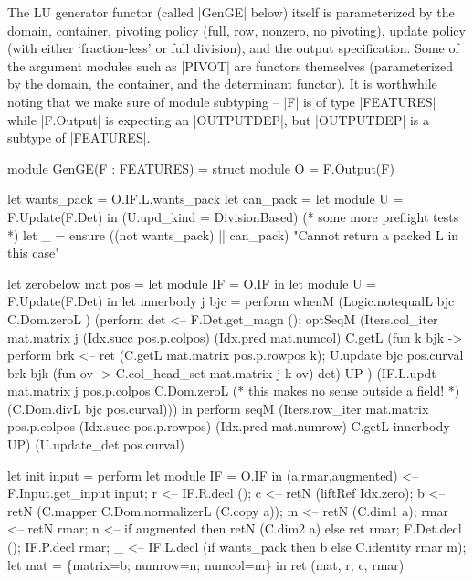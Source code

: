 \documentclass{elsart}
\begin{document}
The LU generator functor (called |GenGE| below) itself is 
parameterized by the domain, container, pivoting policy (full, row,
nonzero, no pivoting), update policy (with either `fraction-less'
or full division), and the output specification. Some of the
argument modules such as |PIVOT| are functors themselves (parameterized
by the domain, the container, and the determinant functor). It is 
worthwhile noting that we make sure of module subtyping -- |F| is of
type |FEATURES| while |F.Output| is expecting an |OUTPUTDEP|, but
|OUTPUTDEP| is a subtype of |FEATURES|.

\begin{code2}
module GenGE(F : FEATURES) = struct
  module O = F.Output(F)

  let wants_pack = O.IF.L.wants_pack
  let can_pack   = 
    let module U = F.Update(F.Det) in
    (U.upd_kind = DivisionBased)
  (* some more preflight tests *)
  let _ = ensure ((not wants_pack) || can_pack) 
         "Cannot return a packed L in this case"

  let zerobelow mat pos = 
    let module IF = O.IF in
    let module U = F.Update(F.Det) in
    let innerbody j bjc = perform
      whenM (Logic.notequalL bjc C.Dom.zeroL ) (perform
        det <-- F.Det.get_magn ();
        optSeqM (Iters.col_iter mat.matrix j (Idx.succ pos.p.colpos) 
         (Idx.pred mat.numcol) C.getL
              (fun k bjk -> perform
              brk <-- ret (C.getL mat.matrix pos.p.rowpos k);
              U.update bjc pos.curval brk bjk 
                (fun ov -> C.col_head_set mat.matrix j k ov) det) UP )
              (IF.L.updt mat.matrix j pos.p.colpos C.Dom.zeroL 
                (* this makes no sense outside a field! *)
                (C.Dom.divL bjc pos.curval))) in
      perform
        seqM (Iters.row_iter mat.matrix pos.p.colpos
               (Idx.succ pos.p.rowpos)
               (Idx.pred mat.numrow) C.getL innerbody UP)
             (U.update_det pos.curval)

 let init input = perform
    let module IF = O.IF in
      (a,rmar,augmented) <-- F.Input.get_input input;
      r <-- IF.R.decl ();
      c <-- retN (liftRef Idx.zero);
      b <-- retN (C.mapper C.Dom.normalizerL (C.copy a));
      m <-- retN (C.dim1 a);
      rmar <-- retN rmar;
      n <-- if augmented then retN (C.dim2 a) else ret rmar;
      F.Det.decl ();
      IF.P.decl rmar;
      _ <-- IF.L.decl (if wants_pack then b else C.identity rmar m);
      let mat = \{matrix=b; numrow=n; numcol=m\} in
      ret (mat, r, c, rmar)


\end{code2}
\end{document}
